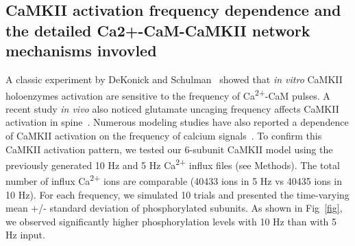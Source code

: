 \documentclass[10pt,letterpaper]{article}
\begin{document}
\begin{comment}
\begin{figure}[!h]
	\caption{{\bf}
	A: Time courses of CaMKII subunits and CaM molecules when given 5 Hz Ca\textsuperscript{2+} influx generated from 16 channels. ‘camkii\_b’ means CaM bound CaMKII subunits. ‘camkii\_p’ means phosphorylated CaMKII subunits. ‘KN2C2 + KpNxC2’ represents CaM molecules bound to either CaMKII or phosphorylated CaMKII and are fully Ca\textsuperscript{2+} loaded on C sites. B: Time courses of phosphorylated CaMKII subunits for 10 Hz (smooth lines) and 5 Hz input (dashed lines) with the complete network, reaction scheme1 and reaction scheme2 respectively. C: Time courses of phosphorylated CaMKII subunits for 10 Hz(fast rising) and 5 Hz input (slow rising) when one holoenzyme contains 2, 6 and 12 subunits respectively. D: With 5 Hz input, time courses of molecule number for subunits that are activated themselves (bound or phosphorylated) and together their neighbors. E: The same as in D except that 10 Hz input is used.}
\label{fig4}
\end{figure}
\end{comment}

\subsection*{CaMKII activation frequency dependence and the detailed Ca2+-CaM-CaMKII network mechanisms invovled}

A classic experiment by DeKonick and Schulman~\cite{DeKoninck:1998wh} showed that \textit{in vitro} CaMKII holoenzymes activation are sensitive to the frequency of Ca\textsuperscript{2+}-CaM pulses. A recent study \textit{in vivo} also noticed glutamate uncaging frequency affects CaMKII activation in spine~\cite{Fujii:2013bg}. Numerous modeling studies have also reported a dependence of CaMKII activation on the frequency of calcium signals~\cite{}. To confirm this CaMKII activation pattern, we tested our 6-subunit CaMKII model using the previously generated 10 Hz and 5 Hz Ca\textsuperscript{2+} influx files (see Methods). The total number of influx Ca\textsuperscript{2+} ions are comparable (40433 ions in 5 Hz vs 40435 ions in 10 Hz). For each frequency, we simulated 10 trials and presented the time-varying mean +/- standard deviation of phosphorylated subunits. As shown in Fig~\ref{fig}, we observed significantly higher phosphorylation levels with 10 Hz than with 5 Hz input.
\end{document}

